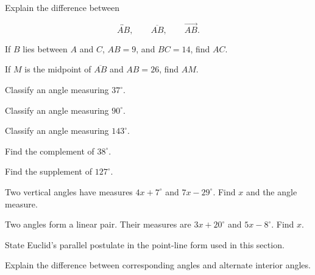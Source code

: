 \begin{exercise}[1]
Explain the difference between

\[ \overleftrightarrow{AB},\qquad\overline{AB},\qquad\overrightarrow{AB}. \]
\end{exercise}

\begin{exercise}[1]
If \(B\) lies between \(A\) and \(C\), \(AB=9\), and \(BC=14\), find \(AC\).
\end{exercise}

\begin{exercise}[1]
If \(M\) is the midpoint of \(\overline{AB}\) and \(AB=26\), find \(AM\).
\end{exercise}

\begin{exercise}[1]
Classify an angle measuring \(37^\circ\).
\end{exercise}

\begin{exercise}[1]
Classify an angle measuring \(90^\circ\).
\end{exercise}

\begin{exercise}[1]
Classify an angle measuring \(143^\circ\).
\end{exercise}

\begin{exercise}[1]
Find the complement of \(38^\circ\).
\end{exercise}

\begin{exercise}[1]
Find the supplement of \(127^\circ\).
\end{exercise}

\begin{exercise}[2]
Two vertical angles have measures \(4x+7^\circ\) and \(7x-29^\circ\).
Find \(x\) and the angle measure.
\end{exercise}

\begin{exercise}[2]
Two angles form a linear pair. Their measures are \(3x+20^\circ\) and
\(5x-8^\circ\). Find \(x\).
\end{exercise}

\begin{exercise}[1]
State Euclid's parallel postulate in the point-line form used in this
section.
\end{exercise}

\begin{exercise}[2]
Explain the difference between corresponding angles and alternate interior
angles.
\end{exercise}

